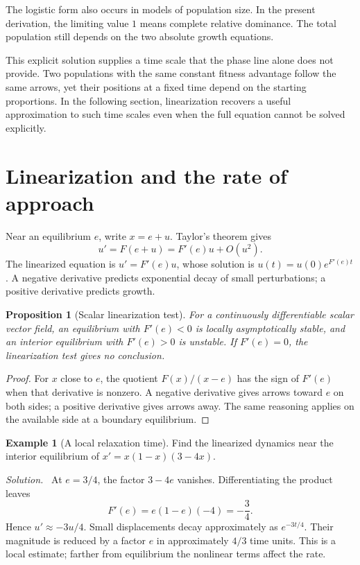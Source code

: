 \documentclass[11pt,oneside,openany]{book}
\newtheorem{proposition}[theorem]{Proposition}
\theoremstyle{definition}
\newtheorem{example}{Example}[chapter]
\theoremstyle{remark}
\newenvironment{solution}{\par\smallskip\noindent\textit{Solution.}\ }{\par\smallskip}
\numberwithin{equation}{chapter}
\begin{document}
The logistic form also occurs in models of population size. In the present derivation, the limiting value $1$ means complete relative dominance. The total population still depends on the two absolute growth equations.

This explicit solution supplies a time scale that the phase line alone does not provide. Two populations with the same constant fitness advantage follow the same arrows, yet their positions at a fixed time depend on the starting proportions. In the following section, linearization recovers a useful approximation to such time scales even when the full equation cannot be solved explicitly.

\section{Linearization and the rate of approach}
Near an equilibrium $e$, write $x=e+u$. Taylor's theorem gives
\[
u'=F(e+u)=F'(e)u+O(u^2).
\]
The linearized equation is $u'=F'(e)u$, whose solution is $u(t)=u(0)e^{F'(e)t}$. A negative derivative predicts exponential decay of small perturbations; a positive derivative predicts growth.

\begin{proposition}[Scalar linearization test]
For a continuously differentiable scalar vector field, an equilibrium with $F'(e)<0$ is locally asymptotically stable, and an interior equilibrium with $F'(e)>0$ is unstable. If $F'(e)=0$, the linearization test gives no conclusion.
\end{proposition}
\begin{proof}
For $x$ close to $e$, the quotient $F(x)/(x-e)$ has the sign of $F'(e)$ when that derivative is nonzero. A negative derivative gives arrows toward $e$ on both sides; a positive derivative gives arrows away. The same reasoning applies on the available side at a boundary equilibrium.
\end{proof}

\begin{example}[A local relaxation time]
Find the linearized dynamics near the interior equilibrium of $x'=x(1-x)(3-4x)$.
\begin{solution}
At $e=3/4$, the factor $3-4e$ vanishes. Differentiating the product leaves
\[
F'(e)=e(1-e)(-4)=-\frac34.
\]
Hence $u'\approx-3u/4$. Small displacements decay approximately as $e^{-3t/4}$. Their magnitude is reduced by a factor $e$ in approximately $4/3$ time units. This is a local estimate; farther from equilibrium the nonlinear terms affect the rate.
\end{solution}
\end{example}
\end{document}
